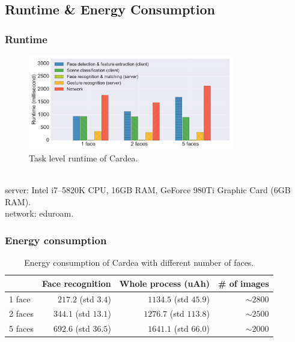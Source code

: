 \subsection{Runtime \& Energy Consumption}
\begin{frame}[t]
\frametitle{Runtime}

\vspace{-0.25cm}
\begin{figure}[tb]
\centering
\includegraphics[width=0.8\textwidth]{figure/ch4-runtime.pdf}
\caption{Task level runtime of Cardea.}
\end{figure}

\\

{\scriptsize \color{blue} server: Intel i7--5820K CPU, 16GB RAM, GeForce 980Ti Graphic Card (6GB RAM).}\\

{\scriptsize \color{blue} network: eduroam.}

\end{frame}

\begin{frame}[t]
\frametitle{Energy consumption}

\begin{table}[tb]
\centering
\caption{Energy consumption of Cardea with different number of faces.}
\begin{tabular}{lrrr}
\toprule
            & Face recognition      & Whole process (uAh)   & \# of images \\ \midrule
1 face      & $217.2$ (std $3.4$)   & $1134.5$ (std $45.9$) & $\sim 2800$       \\
2 faces     & $344.1$ (std $13.1$)  & $1276.7$ (std $113.8$)    & $\sim 2500$       \\
5 faces     & $692.6$ (std $36.5$)  & $1641.1$ (std $66.0$) & $\sim 2000$       \\ \bottomrule
\end{tabular}
\end{table}

\end{frame}
